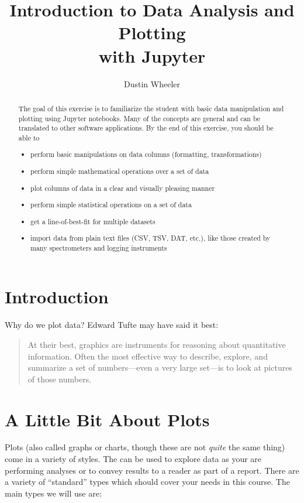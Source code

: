 \documentclass[nobib,nofonts,nols,nohyper]{tufte-handout}
\title{Introduction to Data Analysis and Plotting \\with Jupyter}
\author{Dustin Wheeler}
\begin{document}
\maketitle

\begin{abstract}
	\noindent
	The goal of this exercise is to familiarize the student with basic data manipulation and plotting using Jupyter notebooks.
	Many of the concepts are general and can be translated to other software applications.
	By the end of this exercise, you should be able to
	\begin{itemize}
		\item perform basic manipulations on data columns (formatting, transformations)
		\item perform simple mathematical operations over a set of data
		\item plot columns of data in a clear and visually pleasing manner
		\item perform simple statistical operations on a set of data
		\item get a line-of-best-fit for multiple datasets
		\item import data from plain text files (CSV, TSV, DAT, etc.), like those created by many spectrometers and logging instruments
	\end{itemize}
\end{abstract}

\section{Introduction} %
\label{sec:intro}

Why do we plot data? Edward Tufte may have said it best:

\begin{quote}
	At their best, graphics are instruments for reasoning about quantitative information.
	Often the most effective way to describe, explore, and summarize a set of numbers---even a very large set---is to look at pictures of those numbers.
\end{quote}

\section{A Little Bit About Plots} %
\label{sec:a-little-bit-about-plots}

Plots (also called graphs or charts, though these are not \emph{quite} the same thing) come in a variety of styles.
The can be used to explore data as your are performing analyses or to convey results to a reader as part of a report.
There are a variety of ``standard'' types which should cover your needs in this course.
The main types we will use are:
\end{document}
